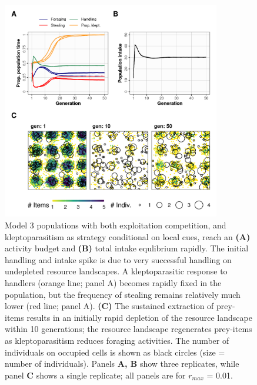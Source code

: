 \documentclass[11pt]{article}
\begin{document}
\begin{figure}[h!]
    \centering
    \includegraphics[width=0.85\textwidth]{figures/fig_04.png}
    \caption{
        Model 3 populations with both exploitation competition, and kleptoparasitism as strategy conditional on local cues, reach an \textbf{(A)} activity budget and \textbf{(B)} total intake equlibrium rapidly.
        The initial handling and intake spike is due to very successful handling on undepleted resource landscapes.
        A kleptoparasitic response to handlers (orange line; panel A) becomes rapidly fixed in the population, but the frequency of stealing remains relatively much lower (red line; panel A).
        \textbf{(C)} The sustained extraction of prey-items results in an initially rapid depletion of the resource landscape within 10 generations; the resource landscape regenerates prey-items as kleptoparasitism reduces foraging activities.
        The number of individuals on occupied cells is shown as black circles (size = number of individuals). Panels \textbf{A, B} show three replicates, while panel \textbf{C} shows a single replicate; all panels are for $r_{max}$ = 0.01.
    }
    \label{Fig:Model3}
\end{figure}
\end{document}
